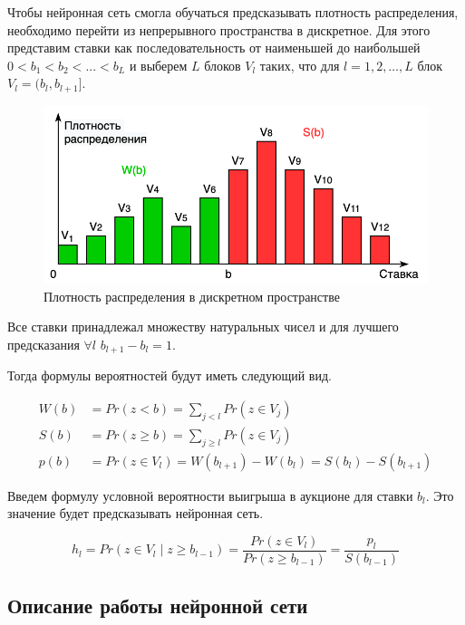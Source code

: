 \documentclass[times,specification,annotation]{itmo-student-thesis}
\begin{document}
Чтобы нейронная сеть смогла обучаться предсказывать плотность распределения, 
необходимо перейти из непрерывного пространства в дискретное.
Для этого представим ставки как последовательность 
от наименьшей до наибольшей $0<b_1<b_2< ...< b_L$ и выберем $L$ блоков $V_l$ таких, 
что для $l=1, 2, …, L$ блок $V_l=(b_l,b_{l+1}]$.

\begin{figure}[h]
    \caption{Плотность распределения в дискретном пространстве}
    \centering
    \includegraphics{w_s_discret.png}
\end{figure}

Все ставки принадлежал множеству натуральных чисел и для лучшего предсказания $\forall l$  $b_{l+1}-b_l=1$.

Тогда формулы вероятностей будут иметь следующий вид.

\begin{equation}
    \begin{split}
        W(b) & = Pr(z < b) = \sum_{j<l} Pr(z \in V_j) \\
        S(b) & = Pr(z \geq b) = \sum_{j \geq l} Pr(z \in V_j) \\
        p(b) & = Pr(z \in V_l) =  W(b_{l + 1}) - W(b_l) = S(b_l) - S(b_{l + 1})
    \end{split}
\end{equation}

Введем формулу условной вероятности выигрыша в аукционе для ставки $b_l$. 
Это значение будет предсказывать нейронная сеть.

\begin{equation}
    h_l = Pr(z \in V_l \mid z \geq b_{l - 1}) = \frac{Pr(z \in V_l)}{Pr(z \geq b_{l - 1})} = \frac{p_l}{S(b_{l - 1})}
\end{equation}

\subsection{Описание работы нейронной сети}
\end{document}
